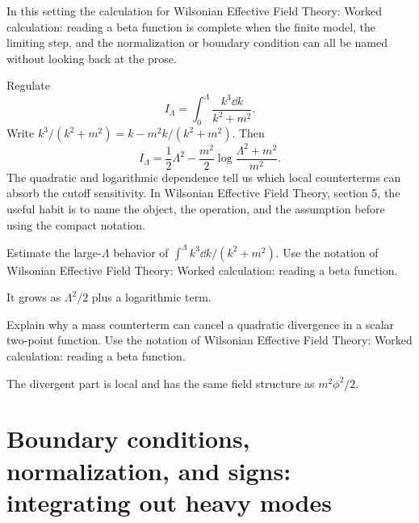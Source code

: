 In this setting the calculation for Wilsonian Effective Field Theory: Worked calculation: reading a beta function is complete when the finite model, the limiting step, and the normalization or boundary condition can all be named without looking back at the prose.




\begin{example}
Regulate
\[
  I_\Lambda=\int_0^\Lambda\frac{k^3\dd k}{k^2+m^2}.
\]
Write \(k^3/(k^2+m^2)=k-m^2k/(k^2+m^2)\).  Then
\[
  I_\Lambda=\frac12\Lambda^2-\frac{m^2}{2}\log\frac{\Lambda^2+m^2}{m^2}.
\]
The quadratic and logarithmic dependence tell us which local counterterms can absorb the cutoff sensitivity.  In Wilsonian Effective Field Theory, section 5, the useful habit is to name the object, the operation, and the assumption before using the compact notation.
\end{example}



\begin{exercise}
Estimate the large-\(\Lambda\) behavior of \(\int^\Lambda k^3\dd k/(k^2+m^2)\).  Use the notation of Wilsonian Effective Field Theory: Worked calculation: reading a beta function.
\begin{answer}
It grows as \(\Lambda^2/2\) plus a logarithmic term.
\end{answer}
\end{exercise}

\begin{exercise}
Explain why a mass counterterm can cancel a quadratic divergence in a scalar two-point function.  Use the notation of Wilsonian Effective Field Theory: Worked calculation: reading a beta function.
\begin{answer}
The divergent part is local and has the same field structure as \(m^2\phi^2/2\).
\end{answer}
\end{exercise}



\section{Boundary conditions, normalization, and signs: integrating out heavy modes}














